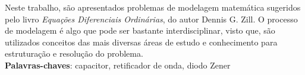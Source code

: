 \setlength{\absparsep}{18pt} %
 \begin{resumo}
Neste trabalho, são apresentados problemas de modelagem matemática sugeridos pelo livro \textit{Equações Diferenciais Ordinárias}, do autor Dennis G. Zill. O processo de modelagem é algo que pode ser bastante interdisciplinar, visto que, são utilizados conceitos das mais diversas áreas de estudo e conhecimento para estruturação e resolução do problema. \\
 \noindent
 \textbf{Palavras-chaves}: capacitor, retificador de onda, diodo Zener
\end{resumo} 